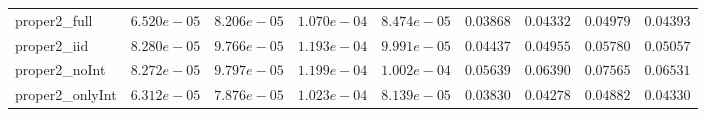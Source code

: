 \begin{table}
\begin{tabular}{lcccccccc}
proper2_full  & $6.520e-05$ & $8.206e-05$ & $1.070e-04$ & $8.474e-05$ & $0.03868$ & $0.04332$ & $0.04979$ & $0.04393$ \\
proper2_iid  & $8.280e-05$ & $9.766e-05$ & $1.193e-04$ & $9.991e-05$ & $0.04437$ & $0.04955$ & $0.05780$ & $0.05057$ \\
proper2_noInt  & $8.272e-05$ & $9.797e-05$ & $1.199e-04$ & $1.002e-04$ & $0.05639$ & $0.06390$ & $0.07565$ & $0.06531$ \\
proper2_onlyInt  & $6.312e-05$ & $7.876e-05$ & $1.023e-04$ & $8.139e-05$ & $0.03830$ & $0.04278$ & $0.04882$ & $0.04330$ \\
\hline 
\end{tabular}


\end{table}